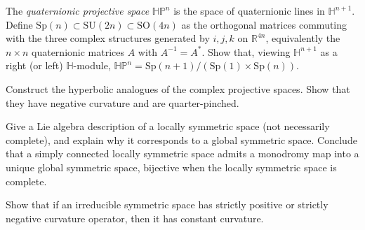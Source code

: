 \begin{remark}
  \label{rem:pet-ch10-exercise-quaternionic-projective-space}
  The \emph{quaternionic projective space} $\mathbb{HP}^n$ is the space of
  quaternionic lines in $\mathbb H^{n+1}$. Define $\mathrm{Sp}(n)\subset\mathrm{SU}(2n)\subset\mathrm{SO}(4n)$
  as the orthogonal matrices commuting with the three complex structures
  generated by $i,j,k$ on $\mathbb R^{4n}$, equivalently the $n\times n$
  quaternionic matrices $A$ with $A^{-1}=A^*$. Show that, viewing $\mathbb H^{n+1}$
  as a right (or left) $\mathbb H$-module, $\mathbb{HP}^n=\mathrm{Sp}(n+1)/(\mathrm{Sp}(1)\times\mathrm{Sp}(n))$.
\end{remark}

\begin{remark}
  \label{rem:pet-ch10-exercise-hyperbolic-complex-projective}
  Construct the hyperbolic analogues of the complex projective spaces. Show
  that they have negative curvature and are quarter-pinched.
\end{remark}

\begin{remark}
  \label{rem:pet-ch10-exercise-lie-algebra-locally-symmetric}
  Give a Lie algebra description of a locally symmetric space (not necessarily
  complete), and explain why it corresponds to a global symmetric space.
  Conclude that a simply connected locally symmetric space admits a monodromy
  map into a unique global symmetric space, bijective when the locally
  symmetric space is complete.
\end{remark}

\begin{remark}
  \label{rem:pet-ch10-exercise-pinched-curvature-operator-constant}
  Show that if an irreducible symmetric space has strictly positive or strictly
  negative curvature operator, then it has constant curvature.
\end{remark}

